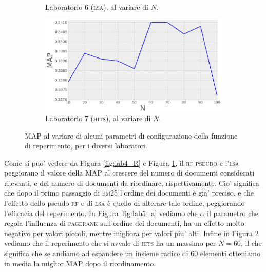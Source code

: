 \begin{figure}
\begin{subfigure}[htpb]{0.475\textwidth}
		\caption[]%
		{{\small Laboratorio 6 (\textsc{lsa}), al variare di $N$.}}    
		\label{fig:lab6_Nd}
	\end{subfigure}
	\quad
	\begin{subfigure}[htpb]{0.475\textwidth}   
		\centering 
		\includegraphics[width=\textwidth]{figures/lab7_N.png}
		\caption[]%
		{{\small Laboratorio 7 (\textsc{hits}), al variare di $N$.}}    
		\label{fig:lab7_Nd}
	\end{subfigure}
        \caption[ The average and standard deviation of claboratorioritical parameters ]
        {\small MAP al variare di alcuni parametri di configurazione della funzione di reperimento, per i diversi laboratori.} 
        \label{fig:map_all}
\end{figure}
Come si puo' vedere da Figura \ref{fig:lab4_R} e Figura \ref{fig:lab6_Nd}, il \textsc{rf pseudo} e l'\textsc{lsa} peggiorano il valore della MAP al crescere del numero di documenti considerati rilevanti, e del numero di documenti da riordinare, rispettivamente. Cio' significa che dopo il primo passaggio di \textsc{bm25} l'ordine dei documenti \`e gia' preciso, e che l'effetto dello pseudo \textsc{rf} e di \textsc{lsa} \`e quello di alterare tale ordine, peggiorando l'efficacia del reperimento. In Figura \ref{fig:lab5_a} vediamo che $\alpha$ il parametro che regola l'influenza di \textsc{pagerank} sull'ordine dei documenti, ha un effetto molto negativo per valori piccoli, mentre migliora per valori piu' alti. Infine in Figura \ref{fig:lab7_Nd} vediamo che il reperimento che si avvale di \textsc{hits} ha un massimo per $N=60$, il che significa che se andiamo ad espandere un insieme radice di 60 elementi otteniamo in media la miglior MAP dopo il riordinamento.

